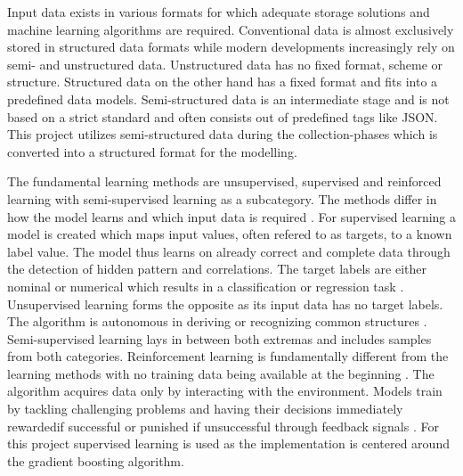 Input data exists in various formats for which adequate storage solutions and machine learning 
algorithms are required. Conventional data is almost exclusively stored in structured data formats 
while modern developments increasingly rely on semi- and unstructured data. Unstructured data has no
fixed format, scheme or structure. Structured data on the other hand has a fixed format and fits into 
a predefined data models. Semi-structured data is an intermediate stage and is not based on a strict
standard and often consists out of predefined tags like \ac{JSON}. This project utilizes semi-structured 
data during the collection-phases which is converted into a structured format for the modelling. 

The fundamental learning methods are unsupervised, supervised and reinforced learning with 
semi-supervised learning as a subcategory. The methods differ in how the model learns and which 
input data is required \cite[4]{2018VDMAQuick}. For supervised learning a model is created which 
maps input values, often refered to as targets, to a known label value. The model thus learns 
on already correct and complete data through the detection of hidden pattern and correlations. 
The target labels are either nominal or numerical which results in a classification or regression 
task \cite[46]{Paass2020}.
Unsupervised learning forms the opposite as its input data has no target labels. The algorithm 
is autonomous in deriving or recognizing common structures \cite[97]{schacht2019blockchain}. Semi-supervised learning lays in 
between both extremas and includes samples from both categories. Reinforcement learning is 
fundamentally different from the learning methods with no training data being available at the 
beginning \cite[7]{2018VDMAQuick}. The algorithm acquires data only by interacting with the environment. Models train by 
tackling challenging problems and having their decisions immediately rewardedif successful or 
punished if unsuccessful through feedback signals \cite[98]{schacht2019blockchain}. For this project supervised learning is 
used as the implementation is centered around the gradient boosting algorithm. 


